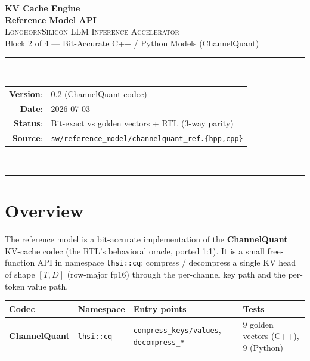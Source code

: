 \documentclass[11pt]{article}
\begin{document}
\thispagestyle{empty}
\begin{center}
\vspace*{1.2in}
{\Huge\bfseries KV Cache Engine}\\[0.4em]
{\LARGE\bfseries Reference Model API}\\[1.2em]

{\large \textsc{LonghornSilicon LLM Inference Accelerator}}\\[0.4em]
{\large Block 2 of 4 --- Bit-Accurate C++ / Python Models (ChannelQuant)}\\[2em]

\rule{0.7\textwidth}{0.4pt}\\[1em]

\begin{tabular}{rl}
\textbf{Version}:    & 0.2 (ChannelQuant codec) \\
\textbf{Date}:       & 2026-07-03 \\
\textbf{Status}:     & Bit-exact vs golden vectors + RTL (3-way parity) \\
\textbf{Source}:     & \texttt{sw/reference\_model/channelquant\_ref.\{hpp,cpp\}} \\
\end{tabular}\\[1em]
\rule{0.7\textwidth}{0.4pt}
\vfill
\end{center}
\clearpage

\tableofcontents
\clearpage

\section{Overview}
\label{sec:overview}

The reference model is a bit-accurate implementation of the \textbf{ChannelQuant}
KV-cache codec (the RTL's behavioral oracle, ported 1:1). It is a small
free-function API in namespace \texttt{lhsi::cq}: compress / decompress a single
KV head of shape $[T, D]$ (row-major fp16) through the per-channel key path and
the per-token value path.

\begin{table}[h]
\centering
\small
\begin{tabular}{@{}l l l l@{}}
\toprule
Codec & Namespace & Entry points & Tests \\
\midrule
\textbf{ChannelQuant} & \texttt{lhsi::cq} & \texttt{compress\_keys/values}, \texttt{decompress\_*} & 9 golden vectors (C++), 9 (Python) \\
\bottomrule
\end{tabular}
\end{table}
\end{document}
